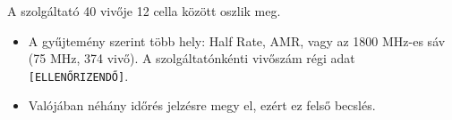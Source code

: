 \begin{center}\end{center}

A szolgáltató 40 vivője 12 cella között oszlik meg.

\begin{center}\end{center}

\begin{center}\end{center}
\begin{eredmeny}

\begin{center}\end{center}
\end{eredmeny}
\begin{tipp}[Ellenőrzés]
\begin{itemize}
\item A gyűjtemény szerint több hely: Half Rate, AMR, vagy az 1800 MHz-es sáv (75 MHz, 374 vivő). A szolgáltatónkénti vivőszám régi adat \texttt{[ELLENŐRIZENDŐ]}.
\item Valójában néhány időrés jelzésre megy el, ezért ez felső becslés.
\end{itemize}
\end{tipp}


